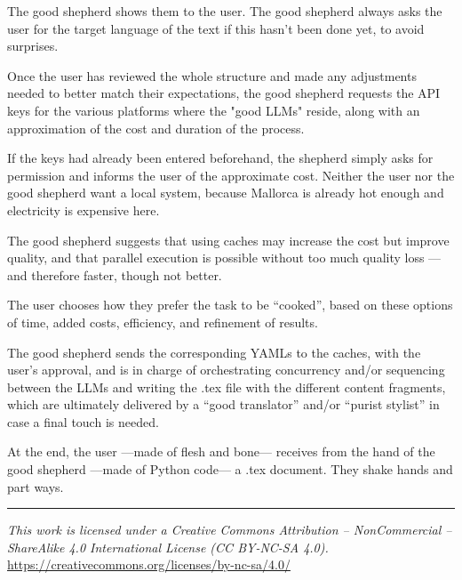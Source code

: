 \documentclass[12pt]{article}
\begin{document}
	The good shepherd shows them to the user. The good shepherd always asks the user for the target language of the text if this hasn’t been done yet, to avoid surprises.\\
	
	\medskip
	
	Once the user has reviewed the whole structure and made any adjustments needed to better match their expectations, the good shepherd requests the API keys for the various platforms where the "good LLMs" reside, along with an approximation of the cost and duration of the process.
	
	If the keys had already been entered beforehand, the shepherd simply asks for permission and informs the user of the approximate cost. Neither the user nor the good shepherd want a local system, because Mallorca is already hot enough and electricity is expensive here.\\
	
	\medskip
	
	The good shepherd suggests that using caches may increase the cost but improve quality, and that parallel execution is possible without too much quality loss — and therefore faster, though not better.
	
	The user chooses how they prefer the task to be “cooked”, based on these options of time, added costs, efficiency, and refinement of results.
	
	The good shepherd sends the corresponding YAMLs to the caches, with the user's approval, and is in charge of orchestrating concurrency and/or sequencing between the LLMs and writing the .tex file with the different content fragments, which are ultimately delivered by a “good translator” and/or “purist stylist” in case a final touch is needed.\\
	
	\medskip
	
	At the end, the user —made of flesh and bone— receives from the hand of the good shepherd —made of Python code— a .tex document. They shake hands and part ways.
	
	\vspace{1cm}
	
	\noindent\rule{\textwidth}{0.4pt}
	
	\vspace{0.5cm}
	
	\noindent
	\textit{This work is licensed under a Creative Commons Attribution – NonCommercial – ShareAlike 4.0 International License (CC BY-NC-SA 4.0).}\\
	\url{https://creativecommons.org/licenses/by-nc-sa/4.0/}
	
\end{document}

